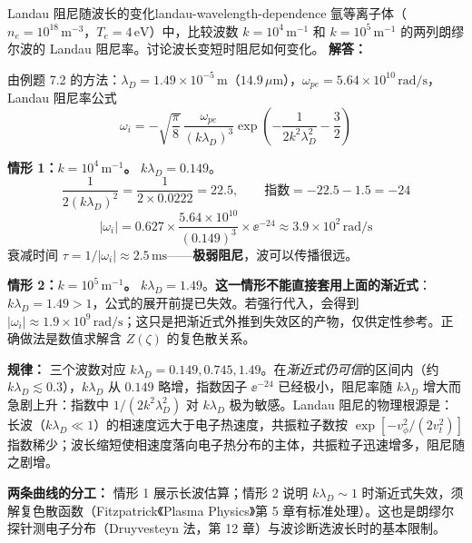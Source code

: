 \begin{example}{Landau 阻尼随波长的变化}{landau-wavelength-dependence}
氩等离子体（$n_e=10^{18}\,\mathrm{m^{-3}}$，$T_e=4\,\mathrm{eV}$）中，比较波数 $k = 10^4\,\mathrm{m^{-1}}$ 和 $k = 10^5\,\mathrm{m^{-1}}$ 的两列朗缪尔波的 Landau 阻尼率。讨论波长变短时阻尼如何变化。
\tcblower
\textbf{解答：}

由例题 7.2 的方法：$\lambda_D = 1.49\times10^{-5}\,\mathrm{m}$（$14.9\,\mu\mathrm{m}$），$\omega_{pe} = 5.64\times10^{10}\,\mathrm{rad/s}$，Landau 阻尼率公式
\[
\omega_i = -\sqrt{\frac{\pi}{8}}\,\frac{\omega_{pe}}{(k\lambda_D)^3}\exp\!\left(-\frac{1}{2k^2\lambda_D^2}-\frac{3}{2}\right)
\]

\textbf{情形 1：$k = 10^4\,\mathrm{m^{-1}}$。} $k\lambda_D = 0.149$。
\[
\frac{1}{2(k\lambda_D)^2} = \frac{1}{2\times0.0222} = 22.5,\qquad \text{指数} = -22.5-1.5 = -24
\]
\[
|\omega_i| = 0.627\times\frac{5.64\times10^{10}}{(0.149)^3}\times\ee^{-24} \approx 3.9\times10^{2}\,\mathrm{rad/s}
\]
衰减时间 $\tau = 1/|\omega_i| \approx 2.5\,\mathrm{ms}$——\textbf{极弱阻尼}，波可以传播很远。

\textbf{情形 2：$k = 10^5\,\mathrm{m^{-1}}$。} $k\lambda_D = 1.49$。\textbf{这一情形不能直接套用上面的渐近式}：$k\lambda_D=1.49>1$，公式的展开前提已失效。若强行代入，会得到 $|\omega_i|\approx1.9\times10^{9}\,\mathrm{rad/s}$；这只是把渐近式外推到失效区的产物，仅供定性参考。正确做法是数值求解含 $Z(\zeta)$ 的复色散关系。

\textbf{规律：} 三个波数对应 $k\lambda_D = 0.149,0.745,1.49$。在\emph{渐近式仍可信}的区间内（约 $k\lambda_D\lesssim0.3$），$k\lambda_D$ 从 $0.149$ 略增，指数因子 $\ee^{-24}$ 已经极小，阻尼率随 $k\lambda_D$ 增大而急剧上升：指数中 $1/(2k^2\lambda_D^2)$ 对 $k\lambda_D$ 极为敏感。Landau 阻尼的物理根源是：长波（$k\lambda_D\ll1$）的相速度远大于电子热速度，共振粒子数按 $\exp[-v_\phi^2/(2v_t^2)]$ 指数稀少；波长缩短使相速度落向电子热分布的主体，共振粒子迅速增多，阻尼随之剧增。

\textbf{两条曲线的分工：} 情形 1 展示长波估算；情形 2 说明 $k\lambda_D\sim1$ 时渐近式失效，须解复色散函数（Fitzpatrick《Plasma Physics》第 5 章有标准处理）。这也是朗缪尔探针测电子分布（Druyvesteyn 法，第 12 章）与波诊断选波长时的基本限制。
\end{example}

